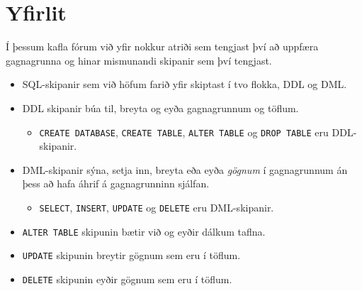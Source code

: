 \newpage
\section{Yfirlit}
Í þessum kafla fórum við yfir nokkur atriði sem tengjast því að uppfæra gagnagrunna og hinar mismunandi skipanir sem því tengjast.
\begin{itemize}
 \item SQL-skipanir sem við höfum farið yfir skiptast í tvo flokka, DDL og DML.
 \item DDL skipanir búa til, breyta og eyða gagnagrunnum og töflum.
 \begin{itemize}
  \item \verb|CREATE DATABASE|, \verb|CREATE TABLE|, \verb|ALTER TABLE| og \verb|DROP TABLE| eru DDL-skipanir.
 \end{itemize}
 \item DML-skipanir sýna, setja inn, breyta eða eyða \emph{gögnum} í gagnagrunnum án þess að hafa áhrif á gagnagrunninn sjálfan.
 \begin{itemize}
  \item \verb|SELECT|, \verb|INSERT|, \verb|UPDATE| og \verb|DELETE| eru DML-skipanir.
 \end{itemize}
 \item \verb|ALTER TABLE| skipunin bætir við og eyðir dálkum taflna.
 \item \verb|UPDATE| skipunin breytir gögnum sem eru í töflum.
 \item \verb|DELETE| skipunin eyðir gögnum sem eru í töflum.
\end{itemize}
